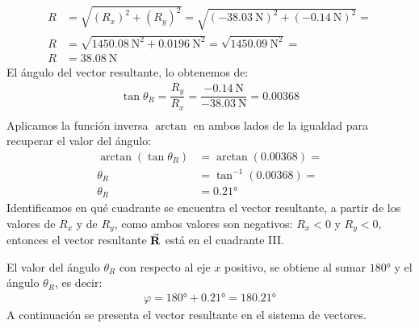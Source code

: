 \documentclass[14pt]{extarticle}
\begin{document}
\begin{align*}
R &= \sqrt{(R_{x})^{2} + (R_{y})^{2}} = \sqrt{(-\SI{38.03}{\newton})^{2} + (-\SI{0.14}{\newton})^{2}} = \\[0.5em]
R &= \sqrt{\SI{1450.08}{\square\newton} + \SI{0.0196}{\square\newton}} = \sqrt{\SI{1450.09}{\square\newton}} = \\[0.5em]
R &= \SI{38.08}{\newton}
\end{align*}
El ángulo del vector resultante, lo obtenemos de:
\begin{align*}
\tan \theta_{R} = \dfrac{R_{y}}{R_{x}} = \dfrac{-\SI{0.14}{\newton}}{-\SI{38.03}{\newton}} = 0.00368 \\[0.5em]
\end{align*}
Aplicamos la función inversa $\arctan$ en ambos lados de la igualdad para recuperar el valor del ángulo:
\begin{align*}
\arctan(\tan \theta_{R}) &= \arctan(0.00368) = \\[0.5em]
\theta_{R} &= \tan^{-1} (0.00368) = \\[0.5em]
\theta_{R} &= \ang{0.21}
\end{align*}
Identificamos en qué cuadrante se encuentra el vector resultante, a partir de los valores de $R_{x}$ y de $R_{y}$, como ambos valores son negativos: $R_{x} < 0$ y $R_{y} < 0$, entonces el vector resultante $\va{R}$ está en el cuadrante III.
\par
El valor del ángulo $\theta_{R}$ con respecto al eje $x$ positivo, se obtiene al sumar $\ang{180}$ y el ángulo $\theta_{R}$, es decir:
\begin{align*}
\varphi = \ang{180} + \ang{0.21} = \ang{180.21}
\end{align*}
A continuación se presenta el vector resultante en el sistema de vectores.
\begin{figure}[H]
\centering
{}
\end{figure}
\end{document}
